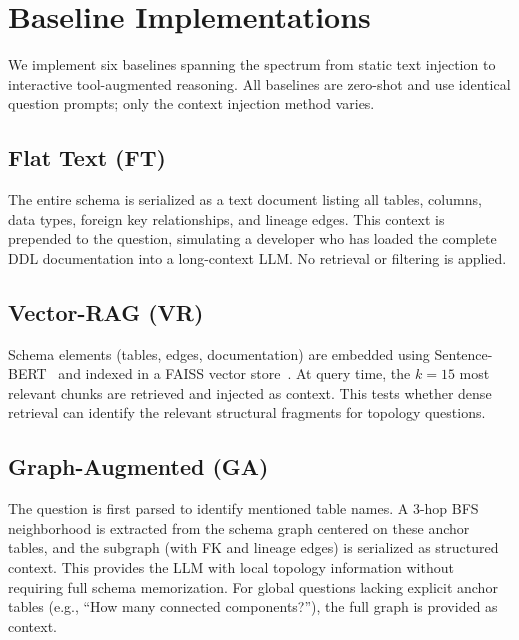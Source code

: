 \section{Baseline Implementations}
\label{sec:baselines}

We implement six baselines spanning the spectrum from static text injection
to interactive tool-augmented reasoning.  All baselines are zero-shot and
use identical question prompts; only the context injection method varies.

\subsection{Flat Text (FT)}

The entire schema is serialized as a text document listing all tables,
columns, data types, foreign key relationships, and lineage edges.  This
context is prepended to the question, simulating a developer who has
loaded the complete DDL documentation into a long-context LLM.  No
retrieval or filtering is applied.

\subsection{Vector-RAG (VR)}

Schema elements (tables, edges, documentation) are embedded using
Sentence-BERT~\cite{reimers2019sentencebert} and indexed in a FAISS vector
store~\cite{johnson2019faiss}.  At query time, the $k=15$ most relevant chunks are retrieved and
injected as context.  This tests whether dense retrieval can identify the
relevant structural fragments for topology questions.

\subsection{Graph-Augmented (GA)}

The question is first parsed to identify mentioned table names.  A 3-hop
BFS neighborhood is extracted from the schema graph centered on these
anchor tables, and the subgraph (with FK and lineage edges) is serialized
as structured context.  This provides the LLM with local topology
information without requiring full schema memorization.  For global
questions lacking explicit anchor tables (e.g., ``How many connected
components?''), the full graph is provided as context.

